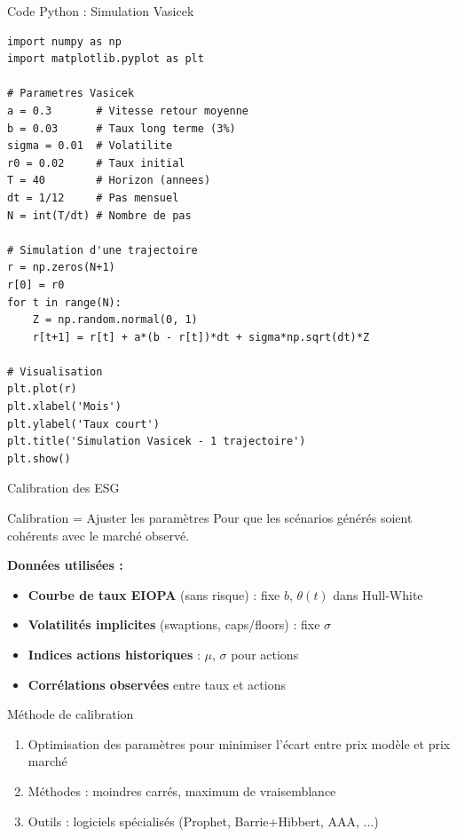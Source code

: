 \documentclass[10pt,aspectratio=169]{beamer}
\begin{document}
\begin{frame}[fragile]{Code Python : Simulation Vasicek}
\begin{lstlisting}[style=pythonstyle]
import numpy as np
import matplotlib.pyplot as plt

# Parametres Vasicek
a = 0.3       # Vitesse retour moyenne
b = 0.03      # Taux long terme (3%)
sigma = 0.01  # Volatilite
r0 = 0.02     # Taux initial
T = 40        # Horizon (annees)
dt = 1/12     # Pas mensuel
N = int(T/dt) # Nombre de pas

# Simulation d'une trajectoire
r = np.zeros(N+1)
r[0] = r0
for t in range(N):
    Z = np.random.normal(0, 1)
    r[t+1] = r[t] + a*(b - r[t])*dt + sigma*np.sqrt(dt)*Z

# Visualisation
plt.plot(r)
plt.xlabel('Mois')
plt.ylabel('Taux court')
plt.title('Simulation Vasicek - 1 trajectoire')
plt.show()
\end{lstlisting}
\end{frame}

\begin{frame}{Calibration des ESG}
\begin{block}{Calibration = Ajuster les paramètres}
Pour que les scénarios générés soient cohérents avec le marché observé.
\end{block}

\textbf{Données utilisées :}
\begin{itemize}
    \item \textbf{Courbe de taux EIOPA} (sans risque) : fixe $b$, $\theta(t)$ dans Hull-White
    \item \textbf{Volatilités implicites} (swaptions, caps/floors) : fixe $\sigma$
    \item \textbf{Indices actions historiques} : $\mu$, $\sigma$ pour actions
    \item \textbf{Corrélations observées} entre taux et actions
\end{itemize}

\vspace{0.3cm}
\begin{exampleblock}{Méthode de calibration}
\begin{enumerate}
    \item Optimisation des paramètres pour minimiser l'écart entre prix modèle et prix marché
    \item Méthodes : moindres carrés, maximum de vraisemblance
    \item Outils : logiciels spécialisés (Prophet, Barrie+Hibbert, AAA, ...)
\end{enumerate}
\end{exampleblock}
\end{frame}
\end{document}
